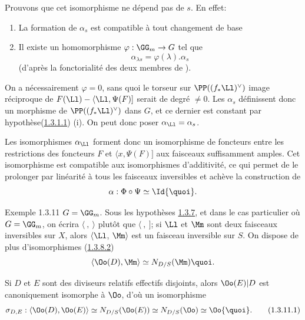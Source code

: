 Prouvons que cet isomorphisme ne dépend pas de $s$. En effet:
\begin{enumerate}
\renewcommand{\theenumi}{\roman{enumi}}
\renewcommand{\labelenumi}{(\theenumi)}
\item La formation de $\alpha_{s}$ est compatible à tout changement de
base

\item Il existe un homomorphisme $\varphi:\GG_{m}\rightarrow G$ tel que
$$
\alpha_{\lambda s}=\varphi(\lambda).\alpha_{s}
$$
(d'après la fonctorialité des deux membres de ).
\end{enumerate}

On a nécessairement $\varphi=0$, sans quoi le torseur sur
$\PP((f_{\ast}\Ll)^{\vee})$ image réciproque de
$F(\Ll)-\langle \Ll,\Psi(F)]$ serait de degré $\neq 0$. Les
$\alpha_{s}$ définissent donc un morphisme de
$\PP((f_{\ast}\Ll)^{\vee})$ dans $G$, et ce dernier est
constant par hypothèse\pageoriginale (\hyperref[XVIII.par1.3.1.1]{1.3.1.1}) (i). 
On peut donc poser $\alpha_{\Ll}=\alpha_{s}$.

Les isomorphismes $\alpha_{\Ll}$ forment donc un isomorphisme
de foncteurs entre les restrictions des foncteurs $F$ et $\langle x,\Psi(F)]$
aux faisceaux suffisamment amples. Cet isomorphisme est compatible aux
isomorphismes d'additivité, ce qui permet de le prolonger par
linéarité à tous les faisceaux inversibles et achève la construction
de
$$
\alpha:\Phi\circ\Psi\simeq \Id{\quoi}.
$$

\begin{enonce*}[remark]{Exemple 1.3.11}
$G=\GG_{m}$. Sous les hypothèses \hyperref[XVIII.subsubsec1.3.7]{1.3.7}, et dans le cas
particulier où $G=\GG_{m}$, on écrira $\langle~,~\rangle $ plutôt que
$\langle~,~]$; si $\Ll$ et $\Mm$ sont deux faisceaux inversibles
sur $X$, alors $\langle \Ll$, $\Mm\rangle $ est un faisceau
inversible sur $S$. On dispose de plus d'isomorphismes (\hyperref[XVIII.par1.3.8.2]{1.3.8.2})
$$
\langle \Oo(D),\Mm\rangle \simeq N_{D/S}(\Mm){\quoi}.
$$

Si $D$ et $E$ sont des diviseurs relatifs  effectifs disjoints, alors
$\Oo(E)|D$ est canoniquement isomorphe à $\Oo$, d'où un isomorphisme
\begin{equation}
\sigma_{D,E}:\langle \Oo(D),\Oo(E)\rangle \simeq N_{D/S}(\Oo(E))\simeq
N_{D/S}(\Oo)\simeq \Oo{\quoi}.\tag{1.3.11.1}
\end{equation}
\end{enonce*}

